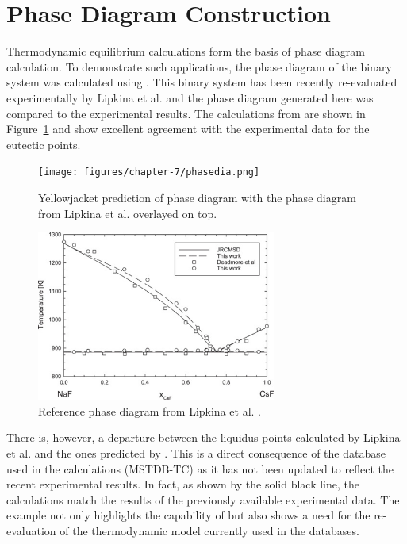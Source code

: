 \section{Phase Diagram Construction}
	Thermodynamic equilibrium calculations form the basis of phase diagram calculation. To demonstrate such applications, the phase diagram of the   binary system was calculated using {\GEM}. This binary system has been recently re-evaluated experimentally by Lipkina et al. \cite{Lipkina:2022aa} and the phase diagram generated here was compared to the experimental results. The calculations from {\GEM} are shown in Figure~\ref{fig:res_phased} and show excellent agreement with the experimental data for the eutectic points.
    \begin{figure}
        \centering
        \texttt{[image: figures/chapter-7/phasedia.png]}
        \caption[Yellowjacket prediction of  phase diagram.]{Yellowjacket prediction of  phase diagram with the phase diagram from Lipkina et al. \cite{Lipkina:2022aa} overlayed on top.}
        \label{fig:res_phased}
    \end{figure}
    \begin{figure}
        \centering
        \includegraphics[width=0.7\textwidth]{figures/chapter-7/pdo.png}
        \caption[Reference  phase  diagram from Lipkina et al.]{Reference  phase  diagram from Lipkina et al. \cite{Lipkina:2022aa}.}
        \label{fig:res_refdia}
    \end{figure}
    There is, however, a departure between the liquidus points calculated by Lipkina et al. and the ones predicted by {\YJ}. This is a direct consequence of the database used in the calculations (MSTDB-TC) as it has not been updated to reflect the recent experimental results. In fact, as shown by the solid black line, the calculations match the results of the previously available experimental data. The example not only highlights the capability of {\GEM} but also shows a need for the re-evaluation of the  thermodynamic model currently used in the databases.
    

